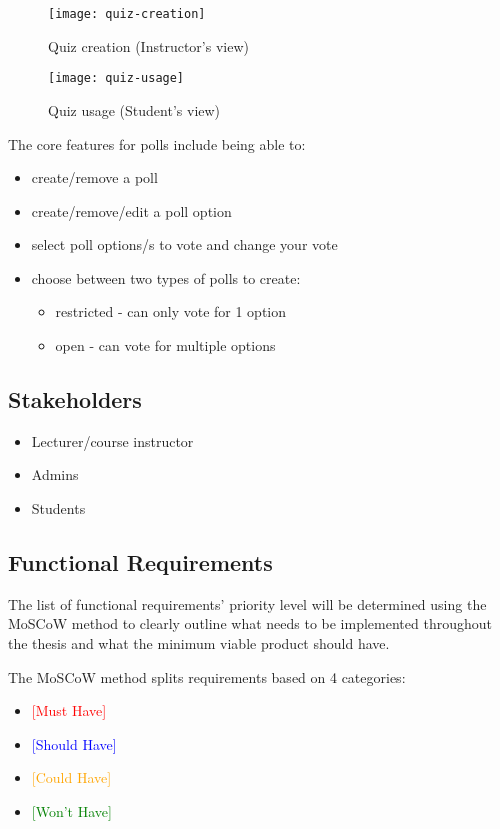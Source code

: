 \begin{figure}[h!]
\centering
\texttt{[image: quiz-creation]}
\caption{Quiz creation (Instructor's view)}
\end{figure}

\begin{figure}[h!]
\centering
\texttt{[image: quiz-usage]}
\caption{Quiz usage (Student's view)}
\end{figure}

The core features for polls include being able to:
\begin{itemize}
	\item create/remove a poll
	\item create/remove/edit a poll option
	\item select poll options/s to vote and change your vote
	\item choose between two types of polls to create:
		\begin{itemize}
			\item restricted - can only vote for 1 option
			\item open - can vote for multiple options
		\end{itemize}
\end{itemize}


\subsection{Stakeholders}
\begin{itemize}
	\item Lecturer/course instructor
	\item Admins
	\item Students
\end{itemize}

\subsection{Functional Requirements}
The list of functional requirements' priority level will be determined using the MoSCoW method to clearly outline what needs to be implemented throughout the thesis and what the minimum viable product should have. 

The MoSCoW method splits requirements based on 4 categories:
\begin{itemize}
	\item \textcolor{Red}{[Must Have]}
	\item \textcolor{Blue}{[Should Have]}
	\item \textcolor{Orange}{[Could Have]}
	\item \textcolor{Green}{[Won't Have]}
\end{itemize}

